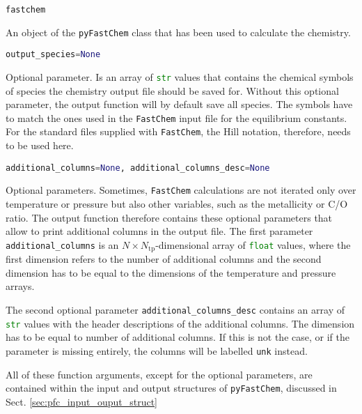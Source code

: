 \documentclass[numbers=noenddot]{aux/fcmanual}
\newcommand{\fc}{\texttt{FastChem}\xspace}
\newcommand{\pfc}{\texttt{pyFastChem}\xspace}
\begin{document}
\lstinline[language=Python]!fastchem!
\begin{addmargin}[25pt]{0pt}
	An object of the \pfc class that has been used to calculate the chemistry. 
\end{addmargin}


\bigbreak

\lstinline[language=Python]!output_species=None!
\begin{addmargin}[25pt]{0pt}
	Optional parameter. Is an array of \lstinline[language=Python]!str! values that contains the chemical symbols of species the chemistry output file should be saved for. Without this optional parameter, the output function will by default save all species. The symbols have to match the ones used in the \fc input file for the equilibrium constants. For the standard files supplied with \fc, the Hill notation, therefore, needs to be used here.
\end{addmargin}

\bigbreak

\lstinline[language=Python]!additional_columns=None, additional_columns_desc=None!
\begin{addmargin}[25pt]{0pt}
	Optional parameters. Sometimes, \fc calculations are not iterated only over temperature or pressure but also other variables, such as the metallicity or C/O ratio. The output function therefore contains these optional parameters that allow to print additional columns in the output file. The first parameter \lstinline[language=Python]!additional_columns! is an $N\times N_\mathrm{tp}$-dimensional array of \lstinline[language=Python]!float! values, where the first dimension refers to the number of additional columns and the second dimension has to be equal to the dimensions of the temperature and pressure arrays. 
	
	The second optional parameter \lstinline[language=Python]!additional_columns_desc! contains an array of \lstinline[language=Python]!str! values with the header descriptions of the additional columns. The dimension has to be equal to number of additional columns. If this is not the case, or if the parameter is missing entirely, the columns will be labelled \texttt{unk} instead.
\end{addmargin}

\bigbreak

All of these function arguments, except for the optional parameters, are contained within the input and output structures of \pfc, discussed in Sect. \ref{sec:pfc_input_ouput_struct}\\
\end{document}

